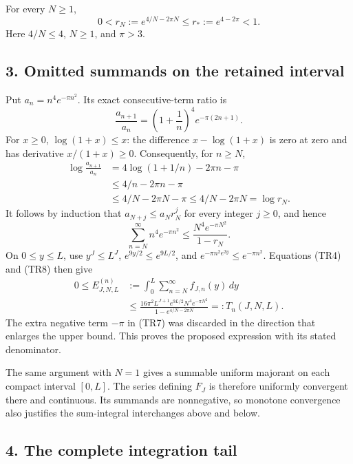 For every \(N\geq1\), \[
 0<r_N:=e^{4/N-2\pi N}
 \leq r_*:=e^{4-2\pi}<1.
 \tag{TR5}
\] Here \(4/N\leq4\), \(N\geq1\), and \(\pi>3\).

\subsection{3. Omitted summands on the retained interval}\label{C47stage:TR:omitted-summands-on-the-retained-interval}

Put \(a_n=n^4e^{-\pi n^2}\). Its exact consecutive-term ratio is \[
 \frac{a_{n+1}}{a_n}
 =\left(1+\frac1n\right)^4e^{-\pi(2n+1)}.
 \tag{TR6}
\] For \(x\geq0\), \(\log(1+x)\leq x\): the difference \(x-\log(1+x)\) is zero at zero and has derivative \(x/(1+x)\geq0\). Consequently, for \(n\geq N\), \[
 \begin{aligned}
 \log\frac{a_{n+1}}{a_n}
 &=4\log(1+1/n)-2\pi n-\pi\\
 &\leq4/n-2\pi n-\pi\\
 &\leq4/N-2\pi N-\pi
 \leq4/N-2\pi N=\log r_N.
 \end{aligned}
 \tag{TR7}
\] It follows by induction that \(a_{N+j}\leq a_Nr_N^j\) for every integer \(j\geq0\), and hence \[
 \sum_{n=N}^{\infty}n^4e^{-\pi n^2}
 \leq \frac{N^4e^{-\pi N^2}}{1-r_N}.
 \tag{TR8}
\] On \(0\leq y\leq L\), use \(y^J\leq L^J\), \(e^{9y/2}\leq e^{9L/2}\), and \(e^{-\pi n^2e^{2y}}\leq e^{-\pi n^2}\). Equations (TR4) and (TR8) then give \[
 \begin{aligned}
 0\leq E_{J,N,L}^{(n)}
 &:=\int_0^L\sum_{n=N}^{\infty}f_{J,n}(y)\,dy\\
 &\leq
 \frac{16\pi^2L^{J+1}e^{9L/2}N^4e^{-\pi N^2}}
 {1-e^{4/N-2\pi N}}
 =:T_n(J,N,L).
 \end{aligned}
 \tag{TR9}
\] The extra negative term \(-\pi\) in (TR7) was discarded in the direction that enlarges the upper bound. This proves the proposed expression with its stated denominator.

The same argument with \(N=1\) gives a summable uniform majorant on each compact interval \([0,L]\). The series defining \(F_J\) is therefore uniformly convergent there and continuous. Its summands are nonnegative, so monotone convergence also justifies the sum-integral interchanges above and below.

\subsection{4. The complete integration tail}\label{C47stage:TR:the-complete-integration-tail}

